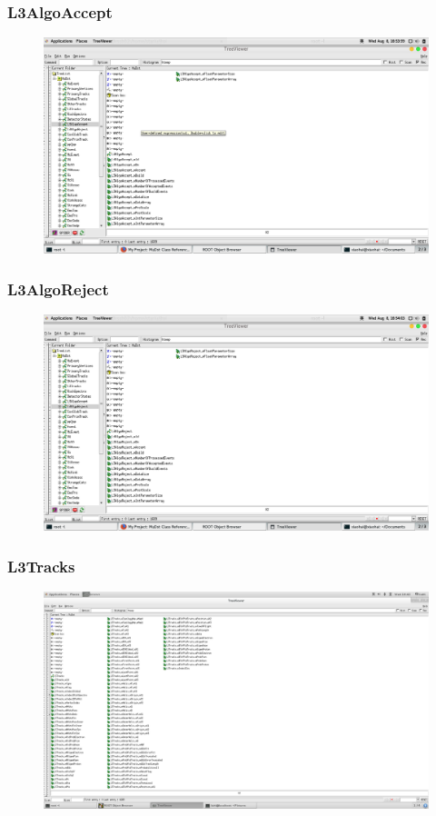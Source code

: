 \documentclass[10pt]{beamer}
\begin{document}
\label{L3AlgoAccept}
\begin{frame}
  \frametitle{L3AlgoAccept}
  \begin{figure}[hbtp]
    \centering
    \includegraphics[width=\textwidth]{L3AlgoAccept.png}
  \end{figure}
\end{frame}
\label{L3AlgoReject}
\begin{frame}
  \frametitle{L3AlgoReject}
  \begin{figure}[hbtp]
    \centering
    \includegraphics[width=\textwidth]{L3AlgoReject.png}
  \end{figure}
\end{frame}
\label{L3Tracks}
\begin{frame}
  \frametitle{L3Tracks}
  \begin{figure}[hbtp]
    \centering
    \includegraphics[width=\textwidth]{L3Tracks.png}
  \end{figure}
\end{frame}
\end{document}
